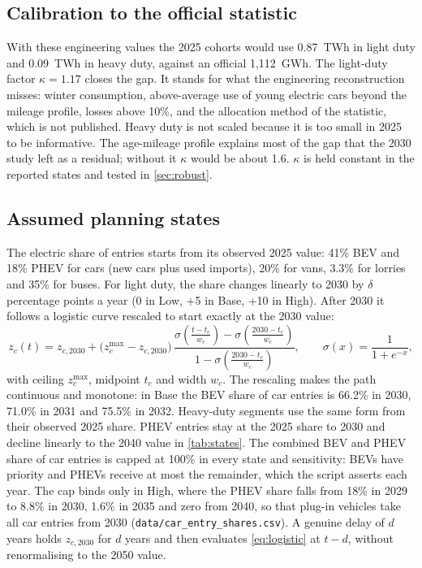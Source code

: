 \documentclass[11pt,a4paper]{article}
\begin{document}
\subsection{Calibration to the official statistic}
With these engineering values the 2025 cohorts would use 0.87~TWh in light duty and 0.09~TWh in heavy duty, against an official 1,112~GWh. The light-duty factor $\kappa=1.17$ closes the gap. It stands for what the engineering reconstruction misses: winter consumption, above-average use of young electric cars beyond the mileage profile, losses above 10\%, and the allocation method of the statistic, which is not published. Heavy duty is not scaled because it is too small in 2025 to be informative. The age-mileage profile explains most of the gap that the 2030 study left as a residual; without it $\kappa$ would be about 1.6. $\kappa$ is held constant in the reported states and tested in \cref{sec:robust}.

\subsection{Assumed planning states}\label{sec:states}
The electric share of entries starts from its observed 2025 value: 41\% BEV and 18\% PHEV for cars (new cars plus used imports), 20\% for vans, 3.3\% for lorries and 35\% for buses. For light duty, the share changes linearly to 2030 by $\delta$ percentage points a year (0 in Low, +5 in Base, +10 in High). After 2030 it follows a logistic curve rescaled to start exactly at the 2030 value:
\begin{equation}\label{eq:logistic}
z_c(t)=z_{c,2030}+\bigl(z_c^{\max}-z_{c,2030}\bigr)\,\frac{\sigma\!\left(\frac{t-t_c}{w_c}\right)-\sigma\!\left(\frac{2030-t_c}{w_c}\right)}{1-\sigma\!\left(\frac{2030-t_c}{w_c}\right)},\qquad \sigma(x)=\frac{1}{1+e^{-x}},
\end{equation}
with ceiling $z_c^{\max}$, midpoint $t_c$ and width $w_c$. The rescaling makes the path continuous and monotone: in Base the BEV share of car entries is 66.2\% in 2030, 71.0\% in 2031 and 75.5\% in 2032. Heavy-duty segments use the same form from their observed 2025 share. PHEV entries stay at the 2025 share to 2030 and decline linearly to the 2040 value in \cref{tab:states}. The combined BEV and PHEV share of car entries is capped at 100\% in every state and sensitivity: BEVs have priority and PHEVs receive at most the remainder, which the script asserts each year. The cap binds only in High, where the PHEV share falls from 18\% in 2029 to 8.8\% in 2030, 1.6\% in 2035 and zero from 2040, so that plug-in vehicles take all car entries from 2030 (\texttt{data/car\_entry\_shares.csv}). A genuine delay of $d$ years holds $z_{c,2030}$ for $d$ years and then evaluates \cref{eq:logistic} at $t-d$, without renormalising to the 2050 value.
\end{document}
